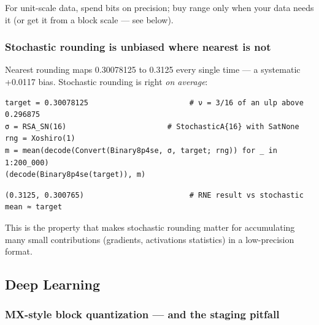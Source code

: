 For unit-scale data, spend bits on precision; buy range only when your data needs it (or get it from a block scale — see below).



\subsubsection{Stochastic rounding is unbiased where nearest is not}



\label{4196957658022129611}{}


Nearest rounding maps 0.30078125 to 0.3125 every single time — a systematic +0.0117 bias. Stochastic rounding is right \emph{on average}:




\nopagebreak[4]
\begin{minipage}{\linewidth}
\begin{verbatim}
target = 0.30078125                       # ν = 3/16 of an ulp above 0.296875
σ = RSA_SN(16)                       # StochasticA{16} with SatNone
rng = Xoshiro(1)
m = mean(decode(Convert(Binary8p4se, σ, target; rng)) for _ in 1:200_000)
(decode(Binary8p4se(target)), m)
\end{verbatim}




\begin{verbatim}
(0.3125, 0.300765)                        # RNE result vs stochastic mean ≈ target
\end{verbatim}
\end{minipage}




This is the property that makes stochastic rounding matter for accumulating many small contributions (gradients, activations statistics) in a low-precision format.



\subsection{Deep Learning}



\label{15209394077164581735-dup1}{}


\subsubsection{MX-style block quantization — and the staging pitfall}



